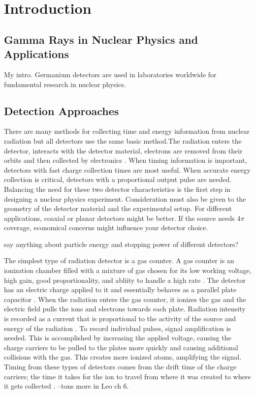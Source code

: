 \chapter{Introduction}
\label{ch:Introduction}

\section{Gamma Rays in Nuclear Physics and Applications}
\indent My intro.
Germanium detectors are used in laboratories worldwide for fundamental research in nuclear physics.



\section{Detection Approaches}
\indent There are many methods for collecting time and energy information from nuclear radiation but all detectors use the same basic method.The radiation enters the detector, interacts with the detector material, electrons are removed from their orbits and then collected by electronics \cite{KK88}. When timing information is important, detectors with fast charge collection times are most useful. When accurate energy collection is critical, detectors with a proportional output pulse are needed. Balancing the need for these two detector characteristics is the first step in designing a nuclear physics experiment. Consideration must also be given to the geometry of the detector material and the experimental setup. For different applications, coaxial or planar detectors might be better. If the source needs 4$\pi$ coverage, economical concerns might influence your detector choice. 

say anything about particle energy and stopping power of different detectors?

The simplest type of radiation detector is a gas counter. A gas counter is an ionization chamber filled with a mixture of gas chosen for its low working voltage, high gain, good proportionality, and abliity to handle a high rate \cite{Leo94}. The detector has an electric charge applied to it and essentially behaves as a parallel plate capacitor \cite{KK88}. When the radiation enters the gas counter, it ionizes the gas and the electric field pulls the ions and electrons towards each plate. Radiation intensity is recorded as a current that is proportional to the activity of the source and energy of the radiation \cite{KK88}. To record individual pulses, signal amplification is needed. This is accomplished by increasing the applied voltage, causing the charge carriers to be pulled to the plates more quickly and causing additional collisions with the gas. This creates more ionized atoms, amplifying the signal. Timing from these types of detectors comes from the drift time of the charge carriers; the time it takes for the ion to travel from where it was created to where it gets collected \cite{KK88}.
--tons more in Leo ch 6.


